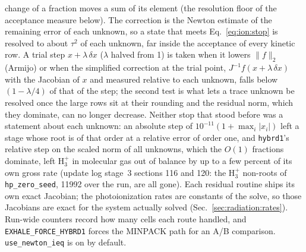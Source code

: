 change of a fraction moves a sum of its element (the resolution floor of the
acceptance measure below). The correction is the Newton estimate of the
remaining error of each unknown, so a state that meets
Eq.~\eqref{eq:ion:stop} is resolved to about $\tau^2$ of each unknown, far
inside the acceptance of every kinetic row. A trial step $x+\lambda\,\delta x$
($\lambda$ halved from 1) is taken when it lowers $\|f\|_2$ (Armijo) or
when the simplified correction at the trial point, $J^{-1}f(x+\lambda\,\delta
x)$ with the Jacobian of $x$ and measured relative to each unknown, falls
below $(1-\lambda/4)$ of that of the step; the second test is what lets a
trace unknown be resolved once the large rows sit at their rounding and the
residual norm, which they dominate, can no longer decrease. Neither stop that
stood before was a statement about each unknown: an absolute step of
$10^{-11}(1+\max_i|x_i|)$ left a stage whose root is of that order at a
relative error of order one, and \texttt{hybrd1}'s relative step on the
scaled norm of all unknowns, which the $O(1)$ fractions dominate, left
H$_3^+$ in molecular gas out of balance by up to a few percent of its own
gross rate (update log stage~3 sections 116 and 120: the H$_3^+$ non-roots of
\texttt{hp\_zero\_seed}, 11992 over the run, are all gone).
Each residual routine ships its own exact
Jacobian; the photoionization rates are constants of the solve, so those
Jacobians are exact for the system actually solved
(Sec.~\ref{sec:radiation:rates}). Run-wide counters record how many cells each
route handled, and \texttt{EXHALE\_FORCE\_HYBRD1} forces the MINPACK path
for an A/B comparison. \texttt{use\_newton\_ieq} is on by default.

